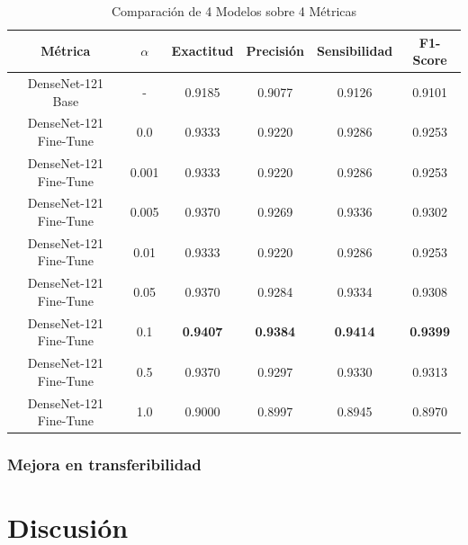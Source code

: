 \begin{table}[H]
	\centering
	\begin{adjustbox}{width=0.8\textwidth}
		\begin{tabular}{|c|c|c|c|c|c|}
			\hline
			\textbf{Métrica} & $\alpha$ & \textbf{Exactitud} & \textbf{Precisión} & \textbf{Sensibilidad} & \textbf{F1-Score} \\
			\hline
			DenseNet-121 Base & - & 0.9185 & 0.9077 & 0.9126 & 0.9101 \\
			\hline
			DenseNet-121 Fine-Tune & 0.0 & 0.9333 & 0.9220 & 0.9286 & 0.9253 \\
			\hline
			DenseNet-121 Fine-Tune & 0.001 & 0.9333 & 0.9220 & 0.9286 & 0.9253 \\
			\hline
			DenseNet-121 Fine-Tune & 0.005 & 0.9370 & 0.9269 & 0.9336 & 0.9302 \\
			\hline
			DenseNet-121 Fine-Tune & 0.01 & 0.9333 & 0.9220 & 0.9286 & 0.9253 \\
			\hline
			DenseNet-121 Fine-Tune & 0.05 & 0.9370 & 0.9284 & 0.9334 & 0.9308 \\
			\hline
			DenseNet-121 Fine-Tune & 0.1 & \textbf{0.9407} & \textbf{0.9384} & \textbf{0.9414} & \textbf{0.9399} \\
			\hline
			DenseNet-121 Fine-Tune & 0.5 & 0.9370 & 0.9297 & 0.9330 & 0.9313 \\
			\hline
			DenseNet-121 Fine-Tune & 1.0 & 0.9000 & 0.8997 & 0.8945 & 0.8970 \\
			\hline
		\end{tabular}
	\end{adjustbox}
	\caption{Comparación de 4 Modelos sobre 4 Métricas}
	\label{tab:model_comparison_test}
\end{table}

\subsubsection{Mejora en transferibilidad}




\section{Discusión}

\endinput

